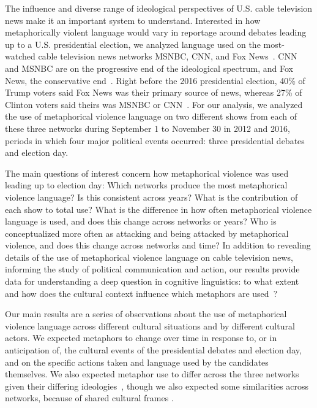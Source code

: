 The influence and diverse range of ideological perspectives of U.S. cable
television news make it an important system to understand.  Interested in how
metaphorically violent language would vary in reportage around debates leading
up to a U.S. presidential election, we analyzed language used on the
most-watched cable television news networks MSNBC, CNN, and Fox
News~\cite{OConnell2017}. CNN and MSNBC are on the progressive end of the
ideological spectrum, and Fox News, the conservative end~\cite{Pew2014}. Right
before the 2016 presidential election, 40\% of Trump voters said Fox News was
their primary source of news, whereas 27\% of Clinton voters said theirs was 
MSNBC or CNN~\cite{Pew2017TrumpClinton}. For our analysis, we analyzed the use of metaphorical violence language on two
different shows from each of these three networks during September 1 to November 30 in 2012
and 2016, periods in which four major political events occurred: three
presidential debates and election day.

The main questions of interest concern how metaphorical violence was used leading
up to election day: Which networks produce the most
metaphorical violence language? Is this consistent across years? What is the
contribution of each show to total use?  What is the difference in how often
metaphorical violence language is used, and does this change across networks or
years? Who is conceptualized more often as attacking and being attacked by
metaphorical violence, and does this change across networks and time? In
addition to revealing details of the use of metaphorical violence language on
cable television news, informing the study of political communication and
action, our results provide data for understanding a deep question in cognitive
linguistics: to what extent and how does the cultural context influence which
metaphors are used~\cite{Gibbs1997,Kovecses2010}? 

Our main results are a series of observations about the use of metaphorical
violence language across different cultural situations and by different cultural
actors. We expected metaphors to change over time in response to, or in
anticipation of, the cultural events of the presidential debates and election
day, and on the specific actions taken and language used by the candidates
themselves. We also expected metaphor use to differ across the three networks
given their differing ideologies~\cite{Lakoff2008}, though we also expected some
similarities across networks, because of shared cultural frames \cite{Kovecses2010}. 


